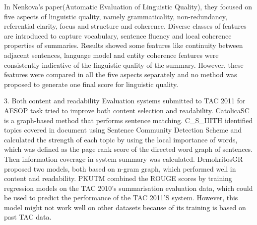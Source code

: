 In Nenkova’s paper(Automatic Evaluation of Linguistic Quality),  they focused on five aspects of linguistic quality, namely grammaticality, non-redundancy, referential clarity, focus and structure and coherence. Diverse classes of features are introduced to capture vocabulary, sentence fluency and local coherence properties of summaries. Results showed some features like continuity between adjacent sentences, language model and entity coherence features were consistently indicative of the linguistic quality of the summary. However, these features were compared in all the five aspects separately and  no method was proposed to generate one final score for linguistic quality.


3. Both content and readability
Evaluation systems submitted to TAC 2011 for AESOP task tried to improve both content selection and readability. CatolicaSC is a graph-based method that performs sentence matching. C\_S\_IIITH 
identified topics covered in document using Sentence Community Detection Scheme and calculated the strength of each topic by using the local importance of words, which was defined as the page rank score of the directed word graph of sentences. Then information coverage in system summary was calculated. DemokritosGR proposed two models, both based on n-gram graph, which performed well in content and readability. PKUTM combined the ROUGE scores by training regression models on the TAC 2010’s summarisation evaluation data, which could be used to predict the performance of the TAC 2011’S system. However, this model might not work well on other datasets because of its training is based on past TAC data.  
